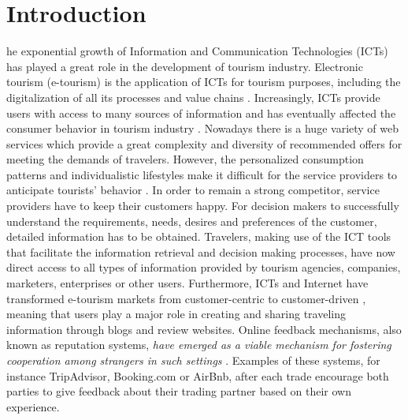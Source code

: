 %
%
\let\textcircled=\pgftextcircled
\chapter{Introduction}
\label{chap:intro}
%
%

he exponential growth of Information and Communication Technologies (ICTs) has played a great role in the development of tourism industry. Electronic tourism (e-tourism) is the application of ICTs for tourism purposes, including the digitalization of all its processes and value chains \cite{buhalis2003etourism}. Increasingly, ICTs provide users with access to many sources of information and has eventually affected the consumer behavior in tourism industry \cite{mills2004handbook}. Nowadays there is a huge variety of web services which provide a great complexity and diversity of recommended offers for meeting the demands of travelers. However, the personalized consumption patterns and individualistic lifestyles make it difficult for the service providers to anticipate tourists' behavior \cite{niemann2008enhancing}.  In order to remain a strong competitor, service providers have to keep their customers happy. For decision makers to successfully understand the requirements, needs, desires and preferences of the customer, detailed information has to be obtained. Travelers, making use of the ICT tools that facilitate the information retrieval and decision making processes, have now direct access to all types of information provided by tourism agencies, companies, marketers, enterprises or other users. Furthermore, ICTs and Internet have transformed e-tourism markets from customer-centric to customer-driven \cite{buhalis2011tourism}, meaning that users play a major role in creating and sharing traveling information through blogs and review websites. Online feedback mechanisms, also known as reputation systems, \textit{have emerged as a viable mechanism for fostering cooperation among strangers in such settings} \cite{dellarocas2003digitization}. Examples of these systems, for instance TripAdvisor, Booking.com or AirBnb, after each trade encourage both parties to give feedback about their trading partner based on their own experience. 

